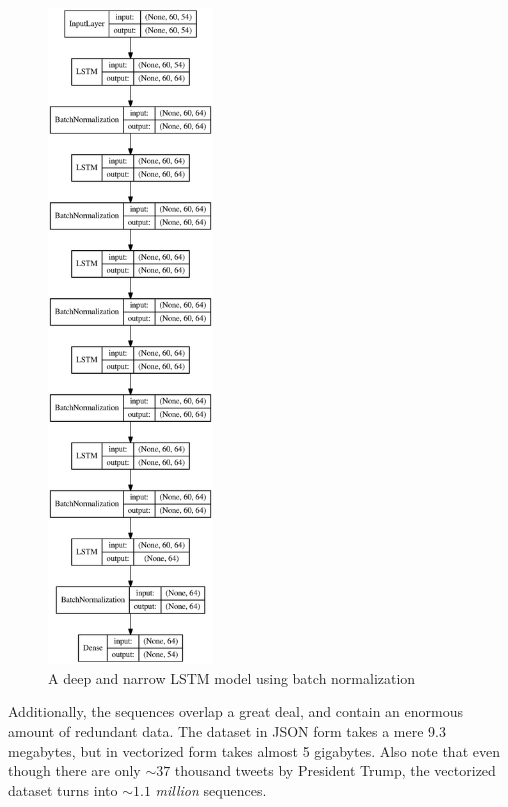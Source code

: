 \documentclass[letterpaper]{article}
\begin{document}
        \newpage
        \begin{figure}
            \centering
            \includegraphics[width=0.39\textwidth]{figures/64x6.eps}
            \caption{A deep and narrow LSTM model using batch normalization}\label{fig:archetecture-64x6}
        \end{figure}

        Additionally, the sequences overlap a great deal, and contain an enormous amount of redundant data. The dataset in JSON form takes a mere 9.3 megabytes, but in vectorized form takes almost 5 gigabytes. Also note that even though there are only $\sim 37$ thousand tweets by President Trump, the vectorized dataset turns into $\sim 1.1$ \textit{million} sequences.
\end{document}
